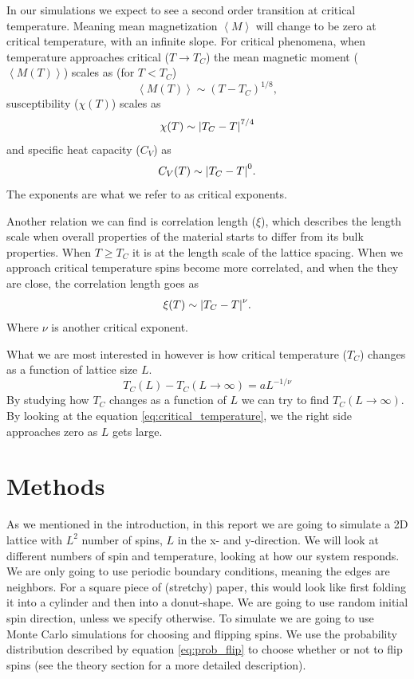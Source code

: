 \documentclass[reprint, english,notitlepage,nofootinbib]{revtex4-1}  %
\begin{document}
In our simulations we expect to see a second order transition at critical temperature. Meaning mean magnetization $\left<M\right>$ will change to be zero at critical temperature, with an infinite slope. For critical phenomena, when temperature approaches critical ($T\rightarrow T_C$) the mean magnetic moment ($\left<M(T)\right>$) scales as (for $T<T_C$)
\begin{equation*}
 	\left<M(T)\right> \sim \left(T - T_C\right)^{1/8},
\end{equation*}
susceptibility ($\chi(T)$) scales as
\begin{equation*}
	\chi(T) \sim \abs{T_C - T}^{7/4}
\end{equation*}
and specific heat capacity ($C_V$) as
\begin{equation*}
	C_V(T) \sim \abs{T_C - T}^0.
\end{equation*}
The exponents are what we refer to as critical exponents.

Another relation we can find is correlation length ($\xi$), which describes the length scale when overall properties of the material starts to differ from its bulk properties. When $T\geq T_C$ it is at the length scale of the lattice spacing. When we approach critical temperature spins become more correlated, and when the they are close, the correlation length goes as
\begin{equation*}
	\xi(T) \sim \abs{T_C - T}^\nu.
\end{equation*}
Where $\nu$ is another critical exponent.

What we are most interested in however is how critical temperature ($T_C$) changes as a function of lattice size $L$.
\begin{equation}
	\label{eq:critical_temperature}
	T_C(L) - T_C(L\rightarrow\infty) = aL^{-1/\nu}
\end{equation}
By studying how $T_C$ changes as a function of $L$ we can try to find $T_C(L\rightarrow\infty)$. By looking at the equation \eqref{eq:critical_temperature}, we the right side approaches zero as $L$ gets large.

\section{Methods}

As we mentioned in the introduction, in this report we are going to simulate a 2D lattice with $L^2$ number of spins, $L$ in the x- and y-direction. We will look at different numbers of spin and temperature, looking at how our system responds. We are only going to use periodic boundary conditions, meaning the edges are neighbors. For a square piece of (stretchy) paper, this would look like first folding it into a cylinder and then into a donut-shape. We are going to use random initial spin direction, unless we specify otherwise. To simulate we are going to use Monte Carlo simulations for choosing and flipping spins. We use the probability distribution described by equation \eqref{eq:prob_flip} to choose whether or not to flip spins (see the theory section for a more detailed description).
\end{document}
